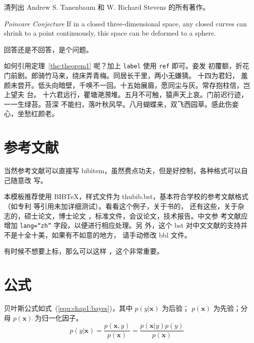 \begin{exercise}
  清列出 Andrew S. Tanenbaum 和 W. Richard Stevens 的所有著作。
\end{exercise}

\begin{conjecture} \textit{Poincare Conjecture} If in a closed three-dimensional
  space, any closed curves can shrink to a point continuously, this space can be
  deformed to a sphere.
\end{conjecture}

\begin{problem}
 回答还是不回答，是个问题。 
\end{problem}

如何引用定理~\ref{the:theorem1} 呢？加上 \verb|label| 使用 \verb|ref| 即可。妾发
初覆额，折花门前剧。郎骑竹马来，绕床弄青梅。同居长干里，两小无嫌猜。 十四为君妇，
羞颜未尝开。低头向暗壁，千唤不一回。十五始展眉，愿同尘与灰。常存抱柱信，岂上望夫
台。 十六君远行，瞿塘滟滪堆。五月不可触，猿声天上哀。门前迟行迹，一一生绿苔。苔深
不能扫，落叶秋风早。八月蝴蝶来，双飞西园草。感此伤妾心，坐愁红颜老。

\section{参考文献}
\label{sec:bib}
当然参考文献可以直接写 bibitem，虽然费点功夫，但是好控制，各种格式可以自己随意改
写。

本模板推荐使用 BIB\TeX，样式文件为 thubib.bst，基本符合学校的参考文献格式（如专利
等引用未加详细测试）。看看这个例子，关于书的\cite{tex, companion, ColdSources}，
还有这些\cite{Krasnogor2004e, clzs, zjsw}，关于杂志的\cite{ELIDRISSI94,
  MELLINGER96, SHELL02}，硕士论文\cite{zhubajie, metamori2004}，博士论文
\cite{shaheshang, FistSystem01}，标准文件\cite{IEEE-1363}，会议论文\cite{DPMG,kocher99}，技术报告\cite{NPB2}。中文参
考文献\cite{cnarticle}应增加 \texttt{lang=``zh''} 字段，以便进行相应处理。另
外，这个 bst 对中文文献\cite{cnproceed}的支持并不是十全十美，如果有不如意的地方，
请手动修改 bbl 文件。

有时候不想要上标，那么可以这样 ，这个非常重要。

\section{公式}
\label{sec:equation}
贝叶斯公式如式~(\ref{equ:chap1:bayes})，其中 $p(y|\mathbf{x})$ 为后验；
$p(\mathbf{x})$ 为先验；分母 $p(\mathbf{x})$ 为归一化因子。
\begin{equation}
\label{equ:chap1:bayes}
p(y|\mathbf{x}) = \frac{p(\mathbf{x},y)}{p(\mathbf{x})}=
\frac{p(\mathbf{x}|y)p(y)}{p(\mathbf{x})} 
\end{equation}

